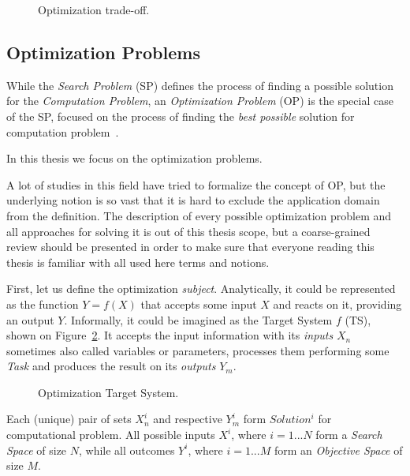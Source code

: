 \begin{figure}
	\centering
	
	\caption{Optimization trade-off.}
	\label{bg:pic:Optimization tradeoff}
\end{figure}

\subsection{Optimization Problems}\label{BG: subsection OPs}
While the \emph{Search Problem} (SP) defines the process of finding a possible solution for the \emph{Computation Problem}, an \emph{Optimization Problem} (OP) is the special case of the SP, focused on the process of finding the \emph{best possible} solution for computation problem~\cite{goldreich2010p}.

In this thesis we focus on the optimization problems.

A lot of studies in this field have tried to formalize the concept of OP, but the underlying notion is so vast that it is hard to exclude the application domain from the definition. The description of every possible optimization problem and all approaches for solving it is out of this thesis scope, but a coarse-grained review should be presented in order to make sure that everyone reading this thesis is familiar with all used here terms and notions. 

First, let us define the optimization \emph{subject}. Analytically, it could be represented as the function $Y = f(X)$ that accepts some input $X$ and reacts on it, providing an output $Y$. Informally, it could be imagined as the Target System $f$ (TS), shown on Figure~\ref{bg:pic:Target System}. It accepts the input information with its \emph{inputs} $X_n$ sometimes also called variables or parameters, processes them performing some \emph{Task} and produces the result on its \emph{outputs} $Y_m$.

\begin{figure}[!h]
	\centering
	
	\caption{Optimization Target System.}
	\label{bg:pic:Target System}
\end{figure}

Each (unique) pair of sets $X_n^i$ and respective $Y_m^i$ form $Solution^i$ for computational problem.
All possible inputs $X^i$, where $i=1...N$ form a \emph{Search Space} of size $N$, while all outcomes $Y^i$, where $i=1...M$ form an \emph{Objective Space} of size $M$.

